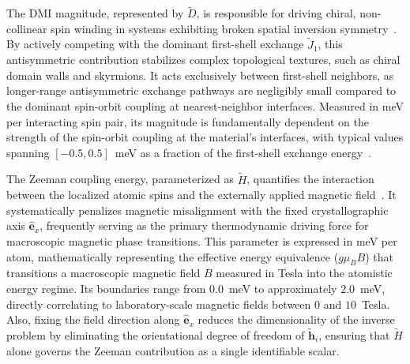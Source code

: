 \documentclass[final,5p,times,twocolumn]{elsarticle}
\begin{document}
The DMI magnitude, represented by $\tilde{D}$, is responsible for driving chiral, non-collinear spin winding in systems exhibiting broken spatial inversion symmetry~\cite{fert2017magnetic}. By actively competing with the dominant first-shell exchange $\tilde{J}_1$, 
this antisymmetric contribution stabilizes complex topological textures, such as chiral domain walls and skyrmions. It acts exclusively between first-shell neighbors, as longer-range antisymmetric exchange pathways are negligibly small compared to the dominant spin-orbit coupling at nearest-neighbor interfaces. Measured in meV per interacting spin pair, its magnitude is fundamentally dependent on the strength of the spin-orbit coupling 
at the material's interfaces, with typical values spanning 
$[-0.5, 0.5]$~meV as a fraction of the first-shell exchange 
energy~\cite{fert2017magnetic}.

The Zeeman coupling energy, parameterized as $\tilde{H}$, quantifies the interaction between the localized atomic spins and the externally applied magnetic field~\cite{evans2014atomistic}. It systematically 
penalizes magnetic misalignment with the fixed crystallographic axis $\hat{\mathbf{e}}_x$, frequently serving as the primary thermodynamic driving force for macroscopic magnetic phase transitions. This 
parameter is expressed in meV per atom, mathematically representing the effective energy equivalence ($g\mu_B B$) that transitions a macroscopic magnetic field $B$ measured in Tesla into the atomistic energy regime. Its boundaries range from $0.0$~meV to approximately $2.0$~meV, directly correlating to laboratory-scale magnetic fields 
between $0$ and $10$~Tesla. Also, fixing the field direction along $\hat{\mathbf{e}}_x$ reduces the dimensionality of the inverse problem by eliminating the orientational degree of freedom of $\tilde{\mathbf{h}}_i$, ensuring that $\tilde{H}$ alone governs the Zeeman contribution as a single identifiable scalar.
\end{document}
